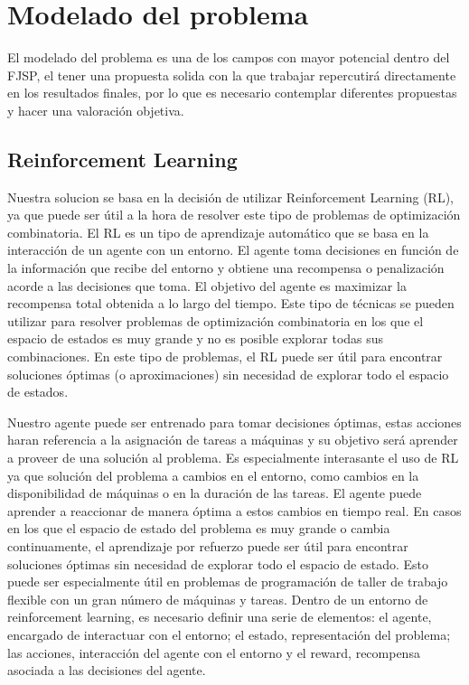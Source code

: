 \section{Modelado del problema}
El modelado del problema es una de los campos con mayor potencial dentro del FJSP, el tener una propuesta
solida con la que trabajar repercutirá directamente en los resultados finales, por lo que es necesario
contemplar diferentes propuestas y hacer una valoración objetiva.

\subsection{Reinforcement Learning}
Nuestra solucion se basa en la decisión de utilizar Reinforcement Learning (RL), ya que puede ser útil a la hora
de resolver este tipo de problemas de optimización combinatoria. El RL es un tipo de aprendizaje automático que
se basa en la interacción de un agente con un entorno. El agente toma decisiones en función de la información
que recibe del entorno y obtiene una recompensa o penalización acorde a las decisiones que toma. El objetivo
del agente es maximizar la recompensa total obtenida a lo largo del tiempo. Este tipo de técnicas se pueden
utilizar para resolver problemas de optimización combinatoria en los que el espacio de estados es muy grande
y no es posible explorar todas sus combinaciones. En este tipo de problemas, el RL puede ser útil para encontrar
soluciones óptimas (o aproximaciones) sin necesidad de explorar todo el espacio de estados.

Nuestro agente puede ser entrenado para tomar decisiones óptimas, estas acciones haran referencia a la
asignación de tareas a máquinas y su objetivo será aprender a proveer de una solución al problema.
Es especialmente interasante el uso de RL ya que solución del problema a cambios en el entorno, como cambios en la disponibilidad
de máquinas o en la duración de las tareas. El agente puede aprender a reaccionar de manera óptima a estos
cambios en tiempo real. En casos en los que el espacio de estado del problema es muy grande o cambia continuamente,
el aprendizaje por refuerzo puede ser útil para encontrar soluciones óptimas sin necesidad de
explorar todo el espacio de estado. Esto puede ser especialmente útil en problemas de programación de taller de trabajo
flexible con un gran número de máquinas y tareas. Dentro de un entorno de reinforcement learning, es necesario definir
una serie de elementos: el agente, encargado de interactuar con el entorno; el estado, representación del problema;
las acciones, interacción del agente con el entorno y el reward, recompensa asociada a las decisiones del agente.


